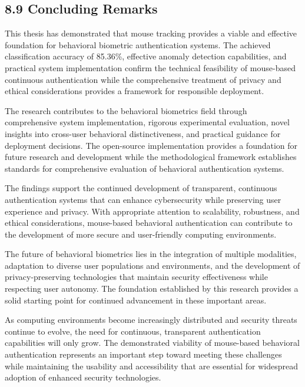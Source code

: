 \documentclass[
  11pt,
  a4paper,
]{article}
\begin{document}
\subsection{8.9 Concluding Remarks}\label{concluding-remarks}

This thesis has demonstrated that mouse tracking provides a viable and
effective foundation for behavioral biometric authentication systems.
The achieved classification accuracy of 85.36\%, effective anomaly
detection capabilities, and practical system implementation confirm the
technical feasibility of mouse-based continuous authentication while the
comprehensive treatment of privacy and ethical considerations provides a
framework for responsible deployment.

The research contributes to the behavioral biometrics field through
comprehensive system implementation, rigorous experimental evaluation,
novel insights into cross-user behavioral distinctiveness, and practical
guidance for deployment decisions. The open-source implementation
provides a foundation for future research and development while the
methodological framework establishes standards for comprehensive
evaluation of behavioral authentication systems.

The findings support the continued development of transparent,
continuous authentication systems that can enhance cybersecurity while
preserving user experience and privacy. With appropriate attention to
scalability, robustness, and ethical considerations, mouse-based
behavioral authentication can contribute to the development of more
secure and user-friendly computing environments.

The future of behavioral biometrics lies in the integration of multiple
modalities, adaptation to diverse user populations and environments, and
the development of privacy-preserving technologies that maintain
security effectiveness while respecting user autonomy. The foundation
established by this research provides a solid starting point for
continued advancement in these important areas.

As computing environments become increasingly distributed and security
threats continue to evolve, the need for continuous, transparent
authentication capabilities will only grow. The demonstrated viability
of mouse-based behavioral authentication represents an important step
toward meeting these challenges while maintaining the usability and
accessibility that are essential for widespread adoption of enhanced
security technologies.
\end{document}

